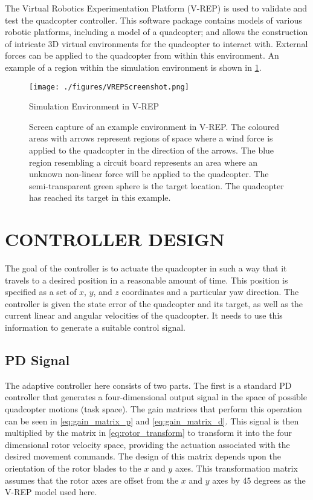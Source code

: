 \documentclass[letterpaper, 10 pt, conference]{ieeeconf}  %
\begin{document}
The Virtual Robotics Experimentation Platform (V-REP) \cite{vrep} is used to validate and test the quadcopter controller.
This software package contains models of various robotic platforms, including a model of a quadcopter; and allows the construction of intricate 3D virtual environments for the quadcopter to interact with.
External forces can be applied to the quadcopter from within this environment.
An example of a region within the simulation environment is shown in \ref{fig:vrep_screenshot}.

\begin{figure}
\centering
\texttt{[image: ./figures/VREPScreenshot.png]}
\caption{Simulation Environment in V-REP}
\label{fig:vrep_screenshot}
\captionsetup{singlelinecheck=off,font=footnotesize}
\caption*{
Screen capture of an example environment in V-REP. The coloured areas with arrows represent regions of space where a wind force is applied to the quadcopter in the direction of the arrows. The blue region resembling a circuit board represents an area where an unknown non-linear force will be applied to the quadcopter. The semi-transparent green sphere is the target location. The quadcopter has reached its target in this example.}
\end{figure}

\section{CONTROLLER DESIGN}

The goal of the controller is to actuate the quadcopter in such a way that it travels to a desired position in a reasonable amount of time. 
This position is specified as a set of $x$, $y$, and $z$ coordinates and a particular yaw direction. 
The controller is given the state error of the quadcopter and its target, as well as the current linear and angular velocities of the quadcopter. 
It needs to use this information to generate a suitable control signal.

\subsection{PD Signal}

The adaptive controller here consists of two parts. The first is a standard PD controller that generates a four-dimensional output signal in the space of possible quadcopter motions (task space). 
The gain matrices that perform this operation can be seen in \eqref{eq:gain_matrix_p} and \eqref{eq:gain_matrix_d}. 
This signal is then multiplied by the matrix in \eqref{eq:rotor_transform} to transform it into the four dimensional rotor velocity space, providing the actuation associated with the desired movement commands.
The design of this matrix depends upon the orientation of the rotor blades to the $x$ and $y$ axes. 
This transformation matrix assumes that the rotor axes are offset from the $x$ and $y$ axes by 45 degrees as the V-REP model used here.
\end{document}
